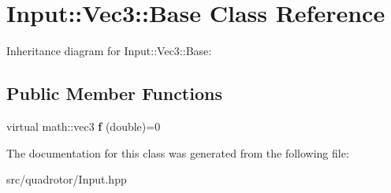 \hypertarget{classInput_1_1Vec3_1_1Base}{
\section{Input::Vec3::Base Class Reference}
\label{classInput_1_1Vec3_1_1Base}
}
Inheritance diagram for Input::Vec3::Base:\subsection*{Public Member Functions}
\begin{DoxyCompactItemize}
\item 
\hypertarget{classInput_1_1Vec3_1_1Base_a2cabb8020f12e27257a220e89136e2cd}{
virtual math::vec3 {\bfseries f} (double)=0}
\label{classInput_1_1Vec3_1_1Base_a2cabb8020f12e27257a220e89136e2cd}

\end{DoxyCompactItemize}


The documentation for this class was generated from the following file:\begin{DoxyCompactItemize}
\item 
src/quadrotor/Input.hpp\end{DoxyCompactItemize}
